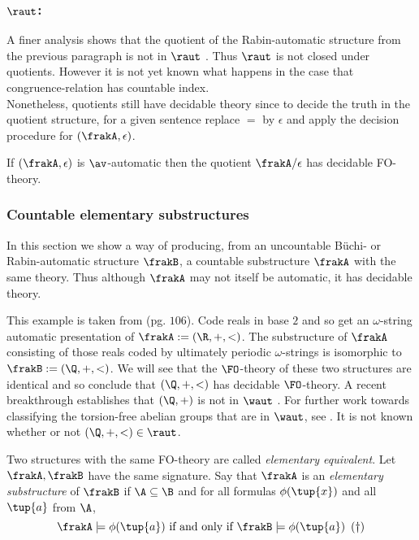 \subsubsection*{$\raut$:} A finer analysis shows that the quotient of the Rabin-automatic structure from the previous paragraph is not in $\raut$ \cite{HKMN08}.
Thus $\raut$ is not closed under quotients. However it is not yet known what happens in the case that congruence-relation has countable index.
~\\

Nonetheless, quotients still have decidable theory since to decide the truth in the quotient structure, for a given sentence replace $=$ by $\epsilon$ and apply the decision procedure for $(\frakA,\epsilon)$.

\begin{proposition} \cite{CoLo07}
If $(\frakA,\epsilon)$ is $\av$-automatic then the quotient $\frakA/\epsilon$ has decidable FO-theory.
\end{proposition}

\subsubsection*{Countable elementary substructures}

In this section we show a way of producing, from an uncountable B\"uchi- or Rabin-automatic structure $\frakB$, a countable substructure $\frakA$
with the same theory. Thus although $\frakA$ may not itself be automatic, it has decidable theory.


\begin{example}
This example is taken from \cite{Dauc93} (pg. $106$). Code reals in base $2$ and so get an $\omega$-string automatic presentation of  $\frakA := (\R,+,<)$. The substructure of $\frakA$ consisting of those reals coded by ultimately periodic $\omega$-strings is isomorphic to $\frakB := (\Q,+,<)$. We will see that the $\FO$-theory of these two structures are  identical and so conclude that $(\Q,+,<)$ has decidable $\FO$-theory. A recent breakthrough establishes that $(\Q,+)$ is not in $\waut$ \cite{Tsan11}. For further work towards classifying the torsion-free abelian groups that are in $\waut$, see \cite{BrSr11}. It is not known whether or not $(\Q,+,<) \in \raut$. 
\end{example} 

Two structures with the same FO-theory are called {\em elementary equivalent}. Let $\frakA,\frakB$ have the same signature. 
Say that $\frakA$ is an {\em elementary substructure} of $\frakB$ if
$\A \subseteq \B$ and for all formulas $\phi(\tup{x})$ and all $\tup{a}$ from $\A$,
\[
\frakA \models \phi(\tup{a}) \mbox{ if and only if } \frakB \models \phi(\tup{a}) \hspace{5pt} (\dagger)
\]

